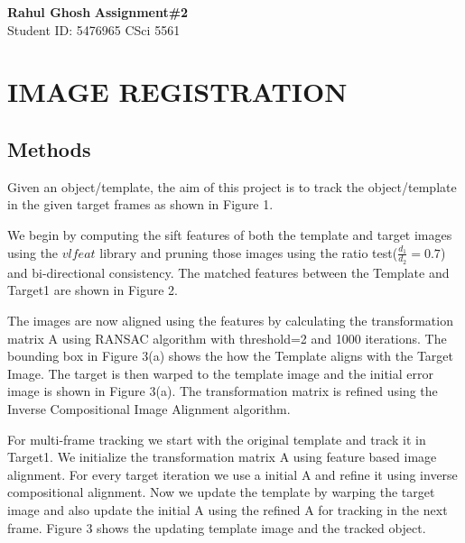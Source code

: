 \documentclass[letter, 10pt]{article}
\begin{document}
\noindent
\large \textbf{Rahul Ghosh} \hfill \textbf{Assignment\#2}\\
\normalsize Student ID: 5476965 \hfill CSci 5561\\

\section*{IMAGE REGISTRATION}
\subsection*{Methods}
Given an object/template, the aim of this project is to track the object/template in the given target frames as shown in Figure 1.

We begin by computing the sift features of both the template and target images using the $vlfeat$ library and pruning those images using the ratio test($\frac{d_1}{d_2}=0.7$) and bi-directional consistency. The matched features between the Template and Target1 are shown in Figure 2.

The images are now aligned using the features by calculating the transformation matrix A using RANSAC algorithm with threshold=2 and 1000 iterations. The bounding box in Figure 3(a) shows the how the Template aligns with the Target Image. The target is then warped to the template image and the initial error image is shown in Figure 3(a). The transformation matrix is refined using the Inverse Compositional Image Alignment algorithm.

For multi-frame tracking we start with the original template and track it in Target1. We initialize the transformation matrix A using feature based image alignment. For every target iteration we use a initial A and refine it using inverse compositional alignment. Now we update the template by warping the target image and also update the initial A using the refined A for tracking in the next frame. Figure 3 shows the updating template image and the tracked object. 
\end{document}

